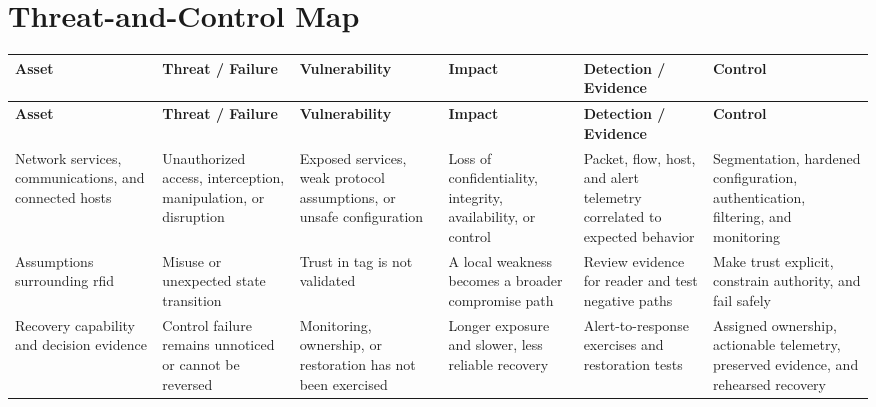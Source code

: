 \documentclass[11pt]{article}
\begin{document}
\section*{Threat-and-Control Map}
\begingroup\scriptsize\setlength{\tabcolsep}{2pt}
\begin{longtable}{>{\RaggedRight\arraybackslash}p{}>{\RaggedRight\arraybackslash}p{}>{\RaggedRight\arraybackslash}p{}>{\RaggedRight\arraybackslash}p{}>{\RaggedRight\arraybackslash}p{}>{\RaggedRight\arraybackslash}p{}}
\toprule\rowcolor{Navy}\color{white}\textbf{Asset} & \color{white}\textbf{Threat / Failure} & \color{white}\textbf{Vulnerability} & \color{white}\textbf{Impact} & \color{white}\textbf{Detection / Evidence} & \color{white}\textbf{Control}\\\midrule
\endfirsthead
\toprule\rowcolor{Navy}\color{white}\textbf{Asset} & \color{white}\textbf{Threat / Failure} & \color{white}\textbf{Vulnerability} & \color{white}\textbf{Impact} & \color{white}\textbf{Detection / Evidence} & \color{white}\textbf{Control}\\\midrule
\endhead
Network services, communications, and connected hosts & Unauthorized access, interception, manipulation, or disruption & Exposed services, weak protocol assumptions, or unsafe configuration & Loss of confidentiality, integrity, availability, or control & Packet, flow, host, and alert telemetry correlated to expected behavior & Segmentation, hardened configuration, authentication, filtering, and monitoring\\\midrule
Assumptions surrounding rfid & Misuse or unexpected state transition & Trust in tag is not validated & A local weakness becomes a broader compromise path & Review evidence for reader and test negative paths & Make trust explicit, constrain authority, and fail safely\\\midrule
Recovery capability and decision evidence & Control failure remains unnoticed or cannot be reversed & Monitoring, ownership, or restoration has not been exercised & Longer exposure and slower, less reliable recovery & Alert-to-response exercises and restoration tests & Assigned ownership, actionable telemetry, preserved evidence, and rehearsed recovery\\\midrule
\bottomrule
\end{longtable}
\endgroup
\end{document}
